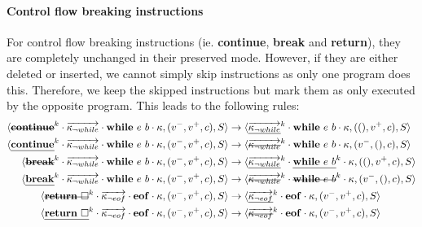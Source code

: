 \documentclass[a4paper,11pt]{article}
\newcommand\mathst[1]{\text{\st{$#1$}}}
\newcommand\mathul[1]{\text{\ul{$#1$}}}
\newcommand\rtstate[3]{\langle #1, #2, #3\rangle}
\begin{document}
\paragraph{Control flow breaking instructions} For control flow breaking instructions (ie. \textbf{continue}, \textbf{break} and \textbf{return}), they are completely unchanged in their preserved mode. However, if they are either deleted or inserted, we cannot simply skip instructions as only one program does this. Therefore, we keep the skipped instructions but mark them as only executed by the opposite program. This leads to the following rules:
\begin{align*}
\rtstate{\mathst{\mathbf{continue}}^k \cdot \overrightarrow{\kappa_{\neg while}} \cdot \mathbf{while}\ e\ b \cdot \kappa}{(v^-, v^+, c)}{S} &\rightarrow \rtstate{\overrightarrow{\mathul{\kappa_{\neg while}}}^k \cdot \mathbf{while}\ e\ b \cdot \kappa}{((), v^+, c)}{S}\\
\rtstate{\mathul{\mathbf{continue}}^k \cdot \overrightarrow{\kappa_{\neg while}} \cdot \mathbf{while}\ e\ b \cdot \kappa}{(v^-, v^+, c)}{S} &\rightarrow \rtstate{\overrightarrow{\mathst{\kappa_{\neg while}}}^k \cdot \mathbf{while}\ e\ b \cdot \kappa}{(v^-, (), c)}{S}\\
\rtstate{\mathst{\mathbf{break}}^k \cdot \overrightarrow{\kappa_{\neg while}} \cdot \mathbf{while}\ e\ b \cdot \kappa}{(v^-, v^+, c)}{S} &\rightarrow \rtstate{\overrightarrow{\mathul{\kappa_{\neg while}}}^k \cdot \mathul{\mathbf{while}\ e\ b}^k \cdot \kappa}{((), v^+, c)}{S}\\
\rtstate{\mathul{\mathbf{break}}^k \cdot \overrightarrow{\kappa_{\neg while}} \cdot \mathbf{while}\ e\ b \cdot \kappa}{(v^-, v^+, c)}{S} &\rightarrow \rtstate{\overrightarrow{\mathst{\kappa_{\neg while}}}^k \cdot \mathst{\mathbf{while}\ e\ b}^k \cdot \kappa}{(v^-, (), c)}{S}\\
\rtstate{\mathst{\mathbf{return}\ \square}^k \cdot \overrightarrow{\kappa_{\neg eof}} \cdot \mathbf{eof} \cdot \kappa}{(v^-, v^+, c)}{S} &\rightarrow \rtstate{\overrightarrow{\mathul{\kappa_{\neg eof}}}^k \cdot \mathbf{eof} \cdot \kappa}{(v^-, v^+, c)}{S}\\
\rtstate{\mathul{\mathbf{return}\ \square}^k \cdot \overrightarrow{\kappa_{\neg eof}} \cdot \mathbf{eof} \cdot \kappa}{(v^-, v^+, c)}{S} &\rightarrow \rtstate{\overrightarrow{\mathst{\kappa_{\neg eof}}}^k \cdot \mathbf{eof} \cdot \kappa}{(v^-, v^+, c)}{S}\\
\end{align*}
\end{document}
